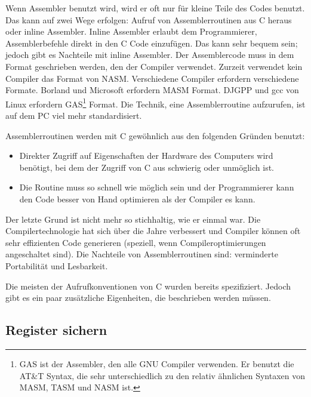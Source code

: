 Wenn Assembler benutzt wird, wird er oft nur f\"{u}r kleine Teile des
Codes benutzt. Das kann auf zwei Wege erfolgen: Aufruf von
Assemblerroutinen aus C heraus oder inline Assembler. Inline
Assembler erlaubt dem Programmierer, Assemblerbefehle direkt in den
C Code einzuf\"{u}gen. Das kann sehr bequem sein; jedoch gibt es
Nachteile mit inline Assembler. Der Assemblercode muss in dem Format
geschrieben werden, den der Compiler verwendet. Zurzeit verwendet
kein Compiler das Format von NASM\@. Verschiedene Compiler erfordern
verschiedene Formate. Borland  und Microsoft
 erfordern MASM Format. DJGPP
 und gcc  von Linux
erfordern GAS\footnote{GAS  ist der Assembler, den alle
GNU Compiler verwenden. Er benutzt die AT\&T Syntax, die sehr
unterschiedlich zu den relativ \"{a}hnlichen Syntaxen von MASM, TASM und
NASM ist.} Format. Die Technik, eine Assemblerroutine aufzurufen,
ist auf dem PC viel mehr standardisiert.

Assemblerroutinen werden mit C gew\"{o}hnlich aus den folgenden Gr\"{u}nden
benutzt:
\begin{itemize}
\parskip=-0.10em %

\item
Direkter Zugriff auf Eigenschaften der Hardware des Computers wird
ben\"{o}tigt, bei dem der Zugriff von C aus schwierig oder unm\"{o}glich
ist.

\item
Die Routine muss so schnell wie m\"{o}glich sein und der Programmierer
kann den Code besser von Hand optimieren als der Compiler es kann.
\end{itemize}

Der letzte Grund ist nicht mehr so stichhaltig, wie er einmal war.
Die Compilertechnologie hat sich \"{u}ber die Jahre verbessert und
Compiler k\"{o}nnen oft sehr effizienten Code generieren (speziell, wenn
Compileroptimierungen angeschaltet sind). Die Nachteile von
Assemblerroutinen sind: verminderte Portabilit\"{a}t und Lesbarkeit.

Die meisten der Aufrufkonventionen von C wurden bereits spezifiziert.
Jedoch gibt es ein paar zus\"{a}tzliche Eigenheiten, die beschrieben
werden m\"{u}ssen.

\subsection{Register sichern}

